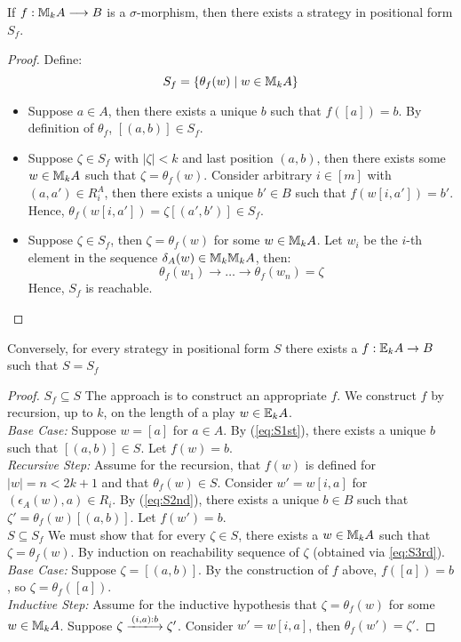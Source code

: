 \begin{prop}
If $f:{\mathbb{M}_{k}A} \longrightarrow B$ is a $\sigma$-morphism, then there exists a strategy in positional form $S_{f}$.
\begin{proof}
Define: 
$$S_{f} = \{\theta_{f}(w) \mid w \in {\mathbb{M}_{k}A}\}$$
\begin{itemize}
\item Suppose $a \in A$, then there exists a unique $b$ such that $f([a]) = b$. By definition of $\theta_{f}$, $[(a,b)] \in S_{f}$. 
\item Suppose $\zeta \in S_{f}$ with $|\zeta| < k$ and last position $(a,b)$, then there exists some $w \in {\mathbb{M}_{k}A}$ such that $\zeta = \theta_{f}(w)$. Consider arbitrary $i \in [m]$ with $(a,a') \in  R_{i}^{A}$, then there exists a unique $b' \in B$ such that $f(w[i,a']) = b'$. Hence, $\theta_{f}(w[i,a']) = \zeta[(a',b')] \in S_{f}$.
\item Suppose $\zeta \in S_{f}$, then $\zeta = \theta_{f}(w)$ for some $w \in {\mathbb{M}_{k}A}$. Let $w_{i}$ be the $i$-th element in the sequence $\delta_{A}(w) \in {\mathbb{M}_{k}{\mathbb{M}_{k}A}}$, then:  
$$\theta_{f}(w_{1}) \longrightarrow \dots \longrightarrow \theta_{f}(w_{n}) = \zeta$$ 
Hence, $S_{f}$ is reachable.
\end{itemize}
\end{proof}
\label{prop:fToPosFormM}
\end{prop}
\begin{prop}
Conversely, for every strategy in positional form $S$ there exists a $f:{\mathbb{E}_{k}A} \rightarrow B$ such that $S = S_{f}$
\begin{proof}
$S_{f} \subseteq S$ The approach is to construct an appropriate $f$. We construct $f$ by recursion, up to $k$, on the length of a play $w \in {\mathbb{E}_{k}A}$. \\ 
\textit{Base Case:} Suppose $w = [a]$ for $a \in A$. By (\ref{eq:S1st}), there exists a unique $b$ such that $[(a,b)] \in S$. Let $f(w) = b$. \\
\textit{Recursive Step:} Assume for the recursion, that $f(w)$ is defined for $|w| = n < 2k+1$ and that $\theta_{f}(w) \in S$. Consider $w' = w[i,a]$ for $(\epsilon_{A}(w),a) \in R_{i}$. By (\ref{eq:S2nd}), there exists a unique $b \in B$ such that $\zeta' = \theta_{f}(w)[(a,b)]$. Let $f(w') = b$. \\
$S \subseteq S_{f}$ We must show that for every $\zeta \in S$, there exists a $w \in {\mathbb{M}_{k}A}$ such that $\zeta = \theta_{f}(w)$. By induction on reachability sequence of $\zeta$ (obtained via \ref{eq:S3rd}). \\
\textit{Base Case:} Suppose $\zeta = [(a,b)]$. By the construction of $f$ above, $f([a]) = b$, so $\zeta = \theta_{f}([a])$. \\
\textit{Inductive Step:} Assume for the inductive hypothesis that $\zeta = \theta_{f}(w)$ for some $w \in {\mathbb{M}_{k}A}$. Suppose $\zeta \xlongrightarrow{(i,a):b} \zeta'$. Consider $w' = w[i,a]$, then $\theta_{f}(w') = \zeta'$.
\end{proof}
\label{prop:posFormToFM}
\end{prop}
